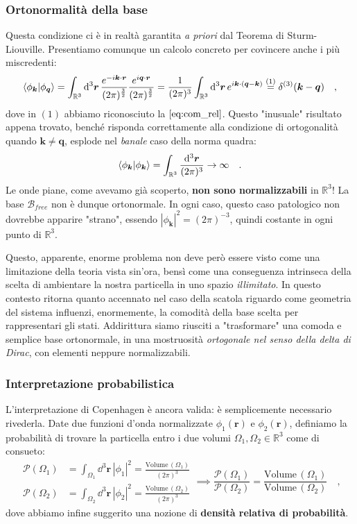\subsubsection{Ortonormalità della base}
Questa condizione ci è in realtà garantita \emph{a priori} dal Teorema di Sturm-Liouville. Presentiamo comunque un calcolo concreto per covincere anche i più miscredenti:
\[
    \braket{\phi_{\bm{k}}}{\phi_{\bm{q}}} = \int_{\mathbb{R}^3} \dd^3{\bm{r}} \, \frac{e^{-i\bm{k}\cdot\bm{r}}}{(2\pi)^{\frac{3}{2}}} \frac{e^{i\bm{q}\cdot\bm{r}}}{(2\pi)^{\frac{3}{2}}} = \frac{1}{(2\pi)^3} \int_{\mathbb{R}^3} \dd^3{\bm{r}} \, e^{i\bm{k}\cdot (\bm{q}-\bm{k})} \overset{(1)}{=} \delta^{(3)}(\bm{k}-\bm{q}) \quad,
\]
dove in $(1)$ abbiamo riconosciuto la $\eqref{eq:com_rel}$. Questo "inusuale" risultato appena trovato, benché risponda correttamente alla condizione di ortogonalità quando $\bm{k} \neq \bm{q}$, esplode nel \emph{banale} caso della norma quadra:
\[
    \braket{\phi_{\bm{k}}}{\phi_{\bm{k}}} = \int_{\mathbb{R}^3} \frac{\dd^3{\bm{r}}}{(2\pi)^3} \to \infty \quad.
\]
Le onde piane, come avevamo già scoperto, \textbf{non sono normalizzabili} in $\mathbb{R}^3$! La base $\mathcal{B}_{free}$ non è dunque ortonormale. In ogni caso, questo caso patologico non dovrebbe apparire "strano", essendo $|\phi_{\bm{k}}|^2 = (2\pi)^{-3}$, quindi costante in ogni punto di $\mathbb{R}^3$. 

Questo, apparente, enorme problema non deve però essere visto come una limitazione della teoria vista sin'ora, bensì come una conseguenza intrinseca della scelta di ambientare la nostra particella in uno spazio \emph{illimitato}. In questo contesto ritorna quanto accennato nel caso della scatola riguardo come geometria del sistema influenzi, enormemente, la comodità della base scelta per rappresentari gli stati. Addirittura siamo riusciti a "trasformare" una comoda e semplice base ortonormale, in una mostruosità \emph{ortogonale nel senso della delta di Dirac}, con elementi neppure normalizzabili. 

\subsubsection{Interpretazione probabilistica}
L'interpretazione di Copenhagen è ancora valida: è semplicemente necessario rivederla. Date due funzioni d'onda normalizzate $\phi_1(\bm{r})$ e $\phi_2(\bm{r})$, definiamo la probabilità di trovare la particella entro i due volumi $\Omega_1, \Omega_2 \in \mathbb{R}^3$ come di consueto:
\[
\begin{aligned}
    \mathcal{P}(\Omega_1) &= \int_{\Omega_1} \dd^3{\bm{r}} \, |\phi_1|^2 = \frac{\text{Volume}\,(\Omega_1)}{(2\pi)^3} \\
    \mathcal{P}(\Omega_2) &= \int_{\Omega_2} \dd^3{\bm{r}} \, |\phi_2|^2 = \frac{\text{Volume}\,(\Omega_2)}{(2\pi)^3}
\end{aligned}
\implies
\frac{\mathcal{P}(\Omega_1)}{\mathcal{P}(\Omega_2)} = \frac{\text{Volume}\,(\Omega_1)}{\text{Volume}\,(\Omega_2)} \quad,
\]
dove abbiamo infine suggerito una nozione di \textbf{densità relativa di probabilità}.

